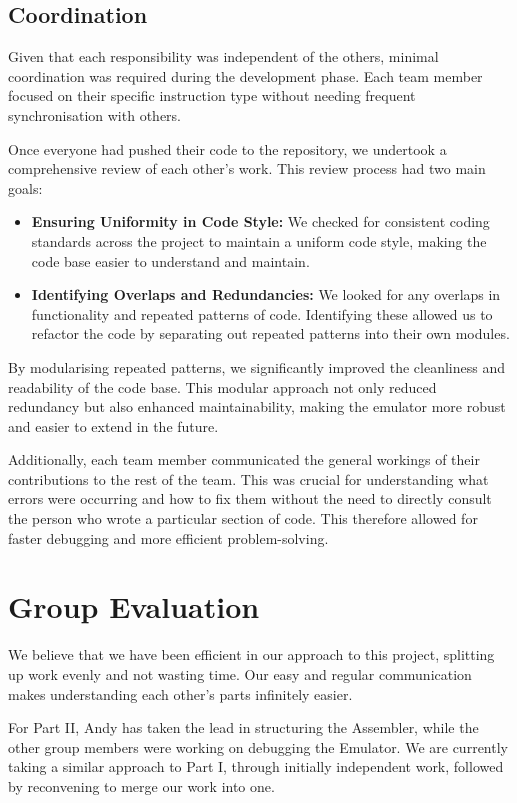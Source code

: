 \documentclass[a4paper, 10pt]{article}
\begin{document}
\subsection{Coordination}

Given that each responsibility was independent of the others, minimal coordination was required during the development phase. Each team member focused on their specific instruction type without needing frequent synchronisation with others.

Once everyone had pushed their code to the repository, we undertook a comprehensive review of each other's work. This review process had two main goals:
\begin{itemize}
    \item \textbf{Ensuring Uniformity in Code Style:} We checked for consistent coding standards across the project to maintain a uniform code style, making the code base easier to understand and maintain.
    \item \textbf{Identifying Overlaps and Redundancies:} We looked for any overlaps in functionality and repeated patterns of code. Identifying these allowed us to refactor the code by separating out repeated patterns into their own modules.
\end{itemize}


By modularising repeated patterns, we significantly improved the cleanliness and readability of the code base. This modular approach not only reduced redundancy but also enhanced maintainability, making the emulator more robust and easier to extend in the future.

Additionally, each team member communicated the general workings of their contributions to the rest of the team. This was crucial for understanding what errors were occurring and how to fix them without the need to directly consult the person who wrote a particular section of code. This therefore allowed for faster debugging and more efficient problem-solving.


\section{Group Evaluation} We believe that we have been efficient in our approach to this project, splitting up work evenly and not wasting time. Our easy and regular communication makes understanding each other's parts infinitely easier.

For Part II, Andy has taken the lead in structuring the Assembler, while the other group members were working on debugging the Emulator. We are currently taking a similar approach to Part I, through initially independent work, followed by reconvening to merge our work into one.
\end{document}
